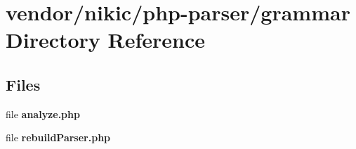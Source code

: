 \section{vendor/nikic/php-\/parser/grammar Directory Reference}
\label{dir_7473ef42eb68ce847d36a9bfd89772ea}
\subsection*{Files}
\begin{DoxyCompactItemize}
\item 
file {\bf analyze.\+php}
\item 
file {\bf rebuild\+Parser.\+php}
\end{DoxyCompactItemize}
